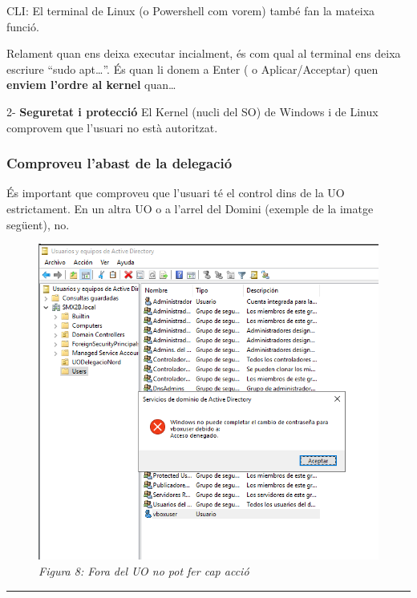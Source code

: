 \documentclass[
  a4paper,
]{article}
\begin{document}
CLI: El terminal de Linux (o Powershell com vorem) també fan la mateixa
funció.

Relament quan ens deixa executar incialment, és com qual al terminal ens
deixa escriure ``sudo apt\ldots{}''. És quan li donem a Enter ( o
Aplicar/Acceptar) quen \textbf{enviem l'ordre al kernel} quan\ldots{}

2- \textbf{Seguretat i protecció} El Kernel (nucli del SO) de Windows i
de Linux comprovem que l'usuari no està autoritzat.

\subsubsection{Comproveu l'abast de la
delegació}\label{comproveu-labast-de-la-delegaciuxf3}

És important que comproveu que l'usuari té el control dins de la UO
estrictament. En un altra UO o a l'arrel del Domini (exemple de la
imatge següent), no.

\begin{figure}
\centering
\includegraphics{png/NoTienePrivilegios.png}
\caption{\emph{Figura 8: Fora del UO no pot fer cap acció}}
\end{figure}

\begin{center}\rule{0.5\linewidth}{0.5pt}\end{center}
\end{document}
